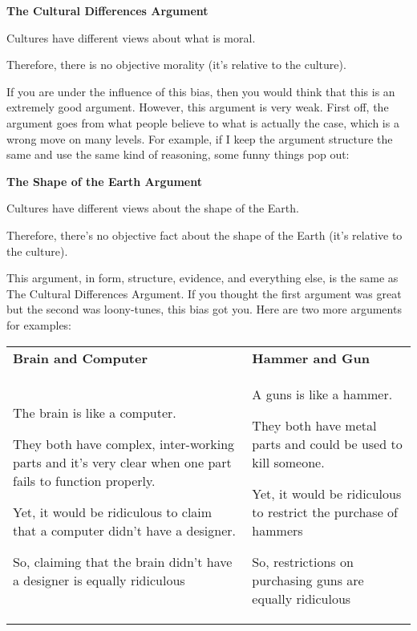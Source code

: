 \textbf{The Cultural Differences Argument}
\begin{earg}
    \item[]Cultures have different views about what is moral.
    \item[]Therefore, there is no objective morality (it's relative to the culture).
\end{earg}

If you are under the influence of this bias, then you would think that this is an extremely good argument. However, this argument is very weak. First off, the argument goes from what people believe to what is actually the case, which is a wrong move on many levels. For example, if I keep the argument structure the same and use the same kind of reasoning, some funny things pop out:

\textbf{The Shape of the Earth Argument}
\begin{earg}
    \item[]Cultures have different views about the shape of the Earth.
    \item[]Therefore, there's no objective fact about the shape of the Earth (it's relative to the culture).
\end{earg}

This argument, in form, structure, evidence, and everything else, is the same as The Cultural Differences Argument. If you thought the first argument was great but the second was loony-tunes, this bias got you.   Here are two more arguments for examples:


\noindent
\begin{tabular}{p{2in}|p{2in}}
\textbf{Brain and Computer} &\textbf{Hammer and Gun}\\
\begin{earg}
    \item[]The brain is like a computer.
    \item[]They both have complex, inter-working parts and it’s very clear when one part fails to function properly.
    \item[]Yet, it would be ridiculous to claim that a computer didn’t have a designer.
    \item[]So, claiming that the brain didn’t have a designer is equally ridiculous
\end{earg}&
\begin{earg}
    \item[]A guns is like a hammer.
    \item[]They both have metal parts and could be used to kill someone.
    \item[]Yet, it would be ridiculous to restrict the purchase of hammers
    \item[]So, restrictions on purchasing guns are equally ridiculous
\end{earg}\\
\end{tabular}

